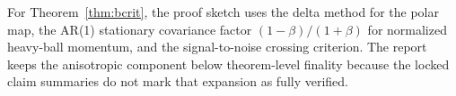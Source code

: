 \documentclass{article}
\begin{document}
For Theorem~\ref{thm:bcrit}, the proof sketch uses the delta method for the polar map, the AR(1) stationary covariance factor $(1-\beta)/(1+\beta)$ for normalized heavy-ball momentum, and the signal-to-noise crossing criterion. The report keeps the anisotropic component below theorem-level finality because the locked claim summaries do not mark that expansion as fully verified.



\end{document}
